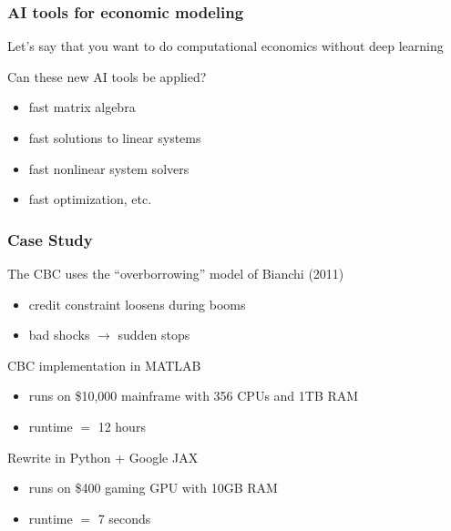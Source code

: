 \begin{frame}
    \frametitle{AI tools for economic modeling}

    Let's say that you want to do computational economics without deep learning

    \vspace{0.5em}
    Can these new AI tools be applied?

    \pause

    \vspace{0.5em}
    \vspace{0.5em}

    \begin{itemize}
        \item fast matrix algebra
        \vspace{0.5em}
        \item fast solutions to linear systems
        \vspace{0.5em}
        \item fast nonlinear system solvers
        \vspace{0.5em}
        \item fast optimization, etc.
    \end{itemize}


\end{frame}



\begin{frame}
    \frametitle{Case Study}

    The CBC uses the ``overborrowing'' model of Bianchi (2011)

    \begin{itemize}
        \item credit constraint loosens during booms
        \item bad shocks $\to$ sudden stops
    \end{itemize}

    \vspace{0.5em}
    CBC implementation in MATLAB 

    \begin{itemize}
        \item runs on \$10,000 mainframe with 356 CPUs and 1TB RAM
        \item runtime $=$ 12 hours
    \end{itemize}

    \pause
    \vspace{0.5em}
    Rewrite in Python + Google JAX

    \begin{itemize}
        \item runs on \$400 gaming GPU with 10GB RAM
        \item runtime $=$ 7 seconds
    \end{itemize}


\end{frame}

